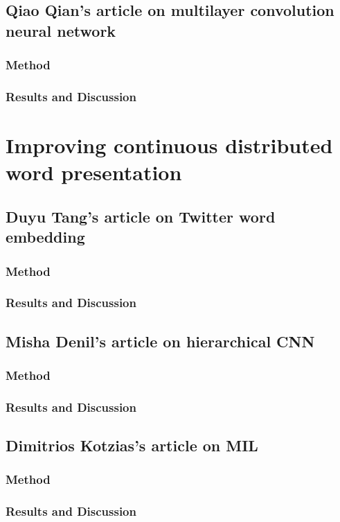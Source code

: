 \subsection{Qiao Qian's article on multilayer convolution neural network}
\subsubsection{Method}

\subsubsection{Results and Discussion} 

\section{Improving continuous distributed word presentation}

\subsection{Duyu Tang's article on Twitter word embedding}
\subsubsection{Method}

\subsubsection{Results and Discussion}


\subsection{Misha Denil's article on hierarchical CNN}
\subsubsection{Method}

\subsubsection{Results and Discussion}


\subsection{Dimitrios Kotzias's article on MIL}
\subsubsection{Method}

\subsubsection{Results and Discussion}

